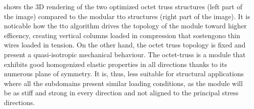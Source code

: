 \begin{figure}
    \hfill
    \hspace*{\fill}
    \bigskip
    \hspace*{\fill}
    \hfill
    \hspace*{\fill}
    \caption{}
    \label{fig:05_octet_results}
\end{figure}

 shows the 3D rendering of the two optimized octet truss structures (left part of the image) compared to the modular \gls{tto} structures (right part of the image). It is noticable how the \gls{tto} algorithm drives the topology of the module toward higher efficency, creating vertical columns loaded in compression that sostengono thin wires loaded in tension. On the other hand, the octet truss topology is fixed and present a quasi-isotropic mechanical behaviour. The octet-truss is a module that exhibits good homogenized elastic properties in all directions thanks to its numerous plane of symmetry. It is, thus, less suitable for structural applications where all the subdomains present similar loading conditions, as the module will be as stiff and strong in every direction and not aligned to the principal stress directions. 

